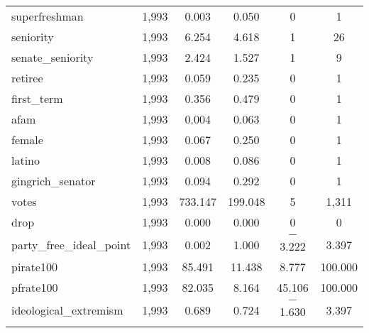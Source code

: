 \documentclass[12pt]{article}
\begin{document}
\begin{table}[H]
\begin{tabular}{@{\extracolsep{5pt}}lccccc}
		superfreshman & 1,993 & 0.003 & 0.050 & 0 & 1 \\ 
		seniority & 1,993 & 6.254 & 4.618 & 1 & 26 \\ 
		senate\_seniority & 1,993 & 2.424 & 1.527 & 1 & 9 \\ 
		retiree & 1,993 & 0.059 & 0.235 & 0 & 1 \\ 
		first\_term & 1,993 & 0.356 & 0.479 & 0 & 1 \\ 
		afam & 1,993 & 0.004 & 0.063 & 0 & 1 \\ 
		female & 1,993 & 0.067 & 0.250 & 0 & 1 \\ 
		latino & 1,993 & 0.008 & 0.086 & 0 & 1 \\ 
		gingrich\_senator & 1,993 & 0.094 & 0.292 & 0 & 1 \\ 
		votes & 1,993 & 733.147 & 199.048 & 5 & 1,311 \\ 
		drop & 1,993 & 0.000 & 0.000 & 0 & 0 \\ 
		party\_free\_ideal\_point & 1,993 & 0.002 & 1.000 & $-$3.222 & 3.397 \\ 
		pirate100 & 1,993 & 85.491 & 11.438 & 8.777 & 100.000 \\ 
		pfrate100 & 1,993 & 82.035 & 8.164 & 45.106 & 100.000 \\ 
		ideological\_extremism & 1,993 & 0.689 & 0.724 & $-$1.630 & 3.397 \\
		\hline \\[-1.8ex] 
	\end{tabular} 
\end{table} 
\end{document}
